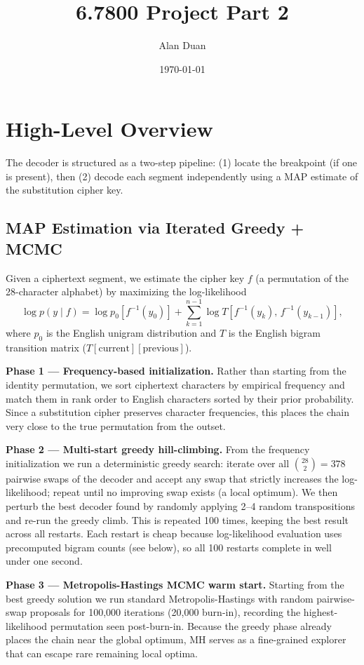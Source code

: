 \documentclass[12pt]{article}
\title{6.7800 Project Part 2}
\author{Alan Duan}
\date{\today}
\begin{document}
\maketitle

\section{High-Level Overview}

The decoder is structured as a two-step pipeline: (1) locate the breakpoint
(if one is present), then (2) decode each segment independently using a MAP
estimate of the substitution cipher key.

\subsection{MAP Estimation via Iterated Greedy + MCMC}

Given a ciphertext segment, we estimate the cipher key $f$ (a permutation of
the 28-character alphabet) by maximizing the log-likelihood
\[
  \log p(y \mid f)
  = \log p_0\!\left[f^{-1}(y_0)\right]
  + \sum_{k=1}^{n-1} \log T\!\left[f^{-1}(y_k),\, f^{-1}(y_{k-1})\right],
\]
where $p_0$ is the English unigram distribution and $T$ is the English bigram
transition matrix ($T[\text{current}][\text{previous}]$).

\textbf{Phase 1 --- Frequency-based initialization.}
Rather than starting from the identity permutation, we sort ciphertext
characters by empirical frequency and match them in rank order to English
characters sorted by their prior probability.  Since a substitution cipher
preserves character frequencies, this places the chain very close to the true
permutation from the outset.

\textbf{Phase 2 --- Multi-start greedy hill-climbing.}
From the frequency initialization we run a deterministic greedy search:
iterate over all $\binom{28}{2}=378$ pairwise swaps of the decoder and accept
any swap that strictly increases the log-likelihood; repeat until no improving
swap exists (a local optimum).  We then perturb the best decoder found by
randomly applying 2--4 random transpositions and re-run the greedy climb.
This is repeated 100 times, keeping the best result across all restarts.
Each restart is cheap because log-likelihood evaluation uses precomputed bigram
counts (see below), so all 100 restarts complete in well under one second.

\textbf{Phase 3 --- Metropolis-Hastings MCMC warm start.}
Starting from the best greedy solution we run standard Metropolis-Hastings
with random pairwise-swap proposals for 100,000 iterations (20,000 burn-in),
recording the highest-likelihood permutation seen post-burn-in.  Because the
greedy phase already places the chain near the global optimum, MH serves as a
fine-grained explorer that can escape rare remaining local optima.
\end{document}
